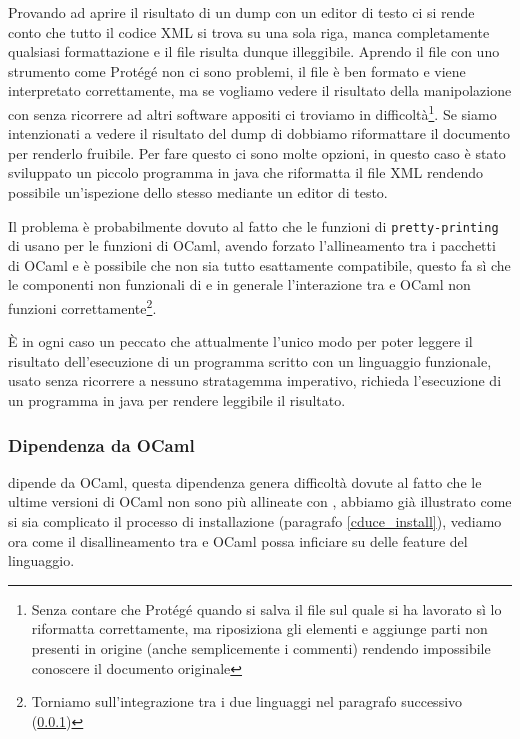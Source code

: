 Provando ad aprire il risultato di un dump con un editor di testo ci si rende conto che tutto il codice XML si trova su una sola riga, manca completamente qualsiasi formattazione e il file risulta dunque illeggibile. Aprendo il file con uno strumento come Protégé non ci sono problemi, il file è ben formato e viene interpretato correttamente, ma se vogliamo vedere il risultato della manipolazione con \cduce senza ricorrere ad altri software appositi ci troviamo in difficoltà\footnote{Senza contare che Protégé quando si salva il file sul quale si ha lavorato sì lo riformatta correttamente, ma riposiziona gli elementi e aggiunge parti non presenti in origine (anche semplicemente i commenti) rendendo impossibile conoscere il documento originale}. Se siamo intenzionati a vedere il risultato del dump di \cduce dobbiamo riformattare il documento per renderlo fruibile. Per fare questo ci sono molte opzioni, in questo caso è stato sviluppato un piccolo programma in java che riformatta il file XML rendendo possibile un'ispezione dello stesso mediante un editor di testo. 

Il problema è probabilmente dovuto al fatto che le funzioni di \verb|pretty-printing| di \cduce usano per le funzioni di OCaml, avendo forzato l'allineamento tra i pacchetti di OCaml e \cduce è possibile che non sia tutto esattamente compatibile, questo fa sì che le componenti non funzionali di \cduce e in generale l'interazione tra \cduce e OCaml non funzioni correttamente\footnote{Torniamo sull'integrazione tra i due linguaggi nel paragrafo successivo (\ref{ocaml_depend})}.

È in ogni caso un peccato che attualmente l'unico modo per poter leggere il risultato dell'esecuzione di un programma scritto con un linguaggio funzionale, usato senza ricorrere a nessuno stratagemma imperativo, richieda l'esecuzione di un programma in java per rendere leggibile il risultato.

\subsubsection{Dipendenza da OCaml}\label{ocaml_depend}
\cduce dipende da OCaml, questa dipendenza genera difficoltà dovute al fatto che le ultime versioni di OCaml non sono più allineate con \cduce, abbiamo già illustrato come si sia complicato il processo di installazione (paragrafo \ref{cduce_install}), vediamo ora come il disallineamento tra \cduce e OCaml possa inficiare su delle feature del linguaggio.

